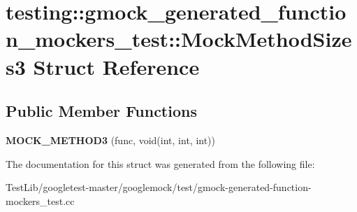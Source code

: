 \hypertarget{structtesting_1_1gmock__generated__function__mockers__test_1_1MockMethodSizes3}{}\section{testing\+:\+:gmock\+\_\+generated\+\_\+function\+\_\+mockers\+\_\+test\+:\+:Mock\+Method\+Sizes3 Struct Reference}
\label{structtesting_1_1gmock__generated__function__mockers__test_1_1MockMethodSizes3}
\subsection*{Public Member Functions}
\begin{DoxyCompactItemize}
\item 
\mbox{\label{structtesting_1_1gmock__generated__function__mockers__test_1_1MockMethodSizes3_a53c9699f920b15d624620e8dab0bfc62}} 
{\bfseries M\+O\+C\+K\+\_\+\+M\+E\+T\+H\+O\+D3} (func, void(int, int, int))
\end{DoxyCompactItemize}


The documentation for this struct was generated from the following file\+:\begin{DoxyCompactItemize}
\item 
Test\+Lib/googletest-\/master/googlemock/test/gmock-\/generated-\/function-\/mockers\+\_\+test.\+cc\end{DoxyCompactItemize}
